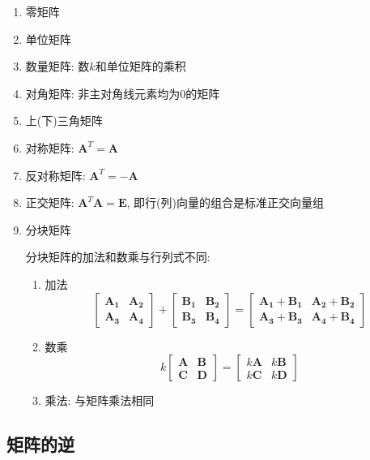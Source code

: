 \begin{enumerate}
	\item 零矩阵
	\item 单位矩阵
	\item 数量矩阵: 数$ k $和单位矩阵的乘积
	\item 对角矩阵: 非主对角线元素均为$ 0 $的矩阵
	\item 上(下)三角矩阵
	\item 对称矩阵: $ \bm{A}^{T}=\bm{A} $
	\item 反对称矩阵: $ \bm{A}^{T}=-\bm{A} $
	\item 正交矩阵: $ \bm{A}^{T}\bm{A}=\bm{E} $, 即行(列)向量的组合是标准正交向量组
	\item 分块矩阵\par
	分块矩阵的加法和数乘与行列式不同:
	\begin{enumerate}
		\item 加法
		\begin{equation*}
			\begin{bmatrix}
				\bm{A_{1}} & \bm{A_{2}} \\ \bm{A_{3}} & \bm{A_{4}}
			\end{bmatrix} + 
		    \begin{bmatrix}
			    \bm{B_{1}} & \bm{B_{2}} \\ \bm{B_{3}} & \bm{B_{4}}
		    \end{bmatrix} = 
	        \begin{bmatrix}
	        	\bm{A_{1}}+\bm{B_{1}} & \bm{A_{2}}+\bm{B_{2}} \\ \bm{A_{3}}+\bm{B_{3}} & \bm{A_{4}}+\bm{B_{4}}
	        \end{bmatrix}
		\end{equation*}
	    \item 数乘
	    \begin{equation*}
	    	k\begin{bmatrix}
	    		\bm{A} & \bm{B} \\ \bm{C} & \bm{D}
	    	\end{bmatrix} = 
    	    \begin{bmatrix}
    	    	k\bm{A} & k\bm{B} \\ k\bm{C} & k\bm{D}
    	    \end{bmatrix}
	    \end{equation*}
        \item 乘法: 与矩阵乘法相同
	\end{enumerate}
\end{enumerate}
\subsection{矩阵的逆}
